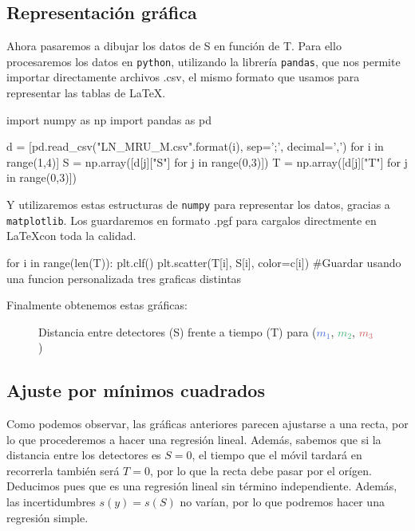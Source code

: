 \documentclass[12pt, a4paper, titlepage]{article}
\newcommand{\code}[1]{\texttt{#1}} %
\begin{document}
  \newpage
  \subsection{Representación gráfica}

  Ahora pasaremos a dibujar los datos de S en función de T. Para ello procesaremos los datos en \code{python}, utilizando la librería \code{pandas}, que nos permite importar directamente archivos .csv, el mismo formato que usamos para representar las tablas de \LaTeX.

  \begin{python}
    import numpy as np
    import pandas as pd

    d = [pd.read_csv("LN_MRU_M{}.csv".format(i), sep=';', decimal=',')
         for i in range(1,4)]
    S = np.array([d[j]["S"] for j in range(0,3)])
    T = np.array([d[j]["T"] for j in range(0,3)])
  \end{python}

  Y utilizaremos estas estructuras de \code{numpy} para representar los datos, gracias a \code{matplotlib}. Los guardaremos en formato .pgf para cargalos directmente en \LaTeX con toda la calidad.

  \begin{python}
    for i in range(len(T)):
        plt.clf()
        plt.scatter(T[i], S[i], color=c[i])
        #Guardar usando una funcion personalizada tres graficas distintas
  \end{python}

  Finalmente obtenemos estas gráficas:
  \begin{figure}[H]
    \centering
     
    
    \caption{Distancia entre detectores (S) frente a tiempo (T) para  (\textcolor{RoyalBlue}{$m_1$}, \textcolor{MediumSeaGreen}{$m_2$}, \textcolor{IndianRed}{$m_3$})}
  \end{figure}

  \newpage
  \subsection{Ajuste por mínimos cuadrados}

  Como podemos observar, las gráficas anteriores parecen ajustarse a una recta, por lo que procederemos a hacer una regresión lineal. Además, sabemos que si la distancia entre los detectores es $S=0$, el tiempo que el móvil tardará en recorrerla también será $T=0$, por lo que la recta debe pasar por el orígen. Deducimos pues que es una regresión lineal sin término independiente. Además, las incertidumbres $s(y) = s(S)$ no varían, por lo que podremos hacer una regresión simple.
\end{document}
